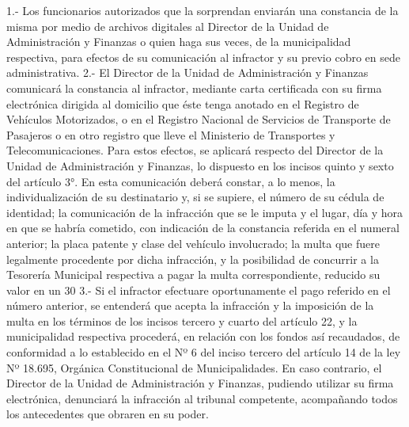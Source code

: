     1.- Los funcionarios autorizados que la sorprendan enviarán una constancia de la misma por medio de archivos digitales al Director de la Unidad de Administración y Finanzas o quien haga sus veces, de la municipalidad respectiva, para efectos de su comunicación al infractor y su previo cobro en sede administrativa.
    2.- El Director de la Unidad de Administración y Finanzas comunicará la constancia al infractor, mediante carta certificada con su firma electrónica dirigida al domicilio que éste tenga anotado en el Registro de Vehículos Motorizados, o en el Registro Nacional de Servicios de Transporte de Pasajeros o en otro registro que lleve el Ministerio de Transportes y Telecomunicaciones. Para estos efectos, se aplicará respecto del Director de la Unidad de Administración y Finanzas, lo dispuesto en los incisos quinto y sexto del artículo 3°. En esta comunicación deberá constar, a lo menos, la individualización de su destinatario y, si se supiere, el número de su cédula de identidad; la comunicación de la infracción que se le imputa y el lugar, día y hora en que se habría cometido, con indicación de la constancia referida en el numeral anterior; la placa patente y clase del vehículo involucrado; la multa que fuere legalmente procedente por dicha infracción, y la posibilidad de concurrir a la Tesorería Municipal respectiva a pagar la multa correspondiente, reducido su valor en un 30%
    3.- Si el infractor efectuare oportunamente el pago referido en el número anterior, se entenderá que acepta la infracción y la imposición de la multa en los términos de los incisos tercero y cuarto del artículo 22, y la municipalidad respectiva procederá, en relación con los fondos así recaudados, de conformidad a lo establecido en el Nº 6 del inciso tercero del artículo 14 de la ley Nº 18.695, Orgánica Constitucional de Municipalidades. En caso contrario, el Director de la Unidad de Administración y Finanzas, pudiendo utilizar su firma electrónica, denunciará la infracción al tribunal competente, acompañando todos los antecedentes que obraren en su poder.
